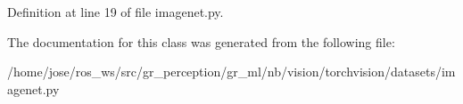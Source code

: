 Definition at line 19 of file imagenet.\+py.



The documentation for this class was generated from the following file\+:\begin{DoxyCompactItemize}
\item 
/home/jose/ros\+\_\+ws/src/gr\+\_\+perception/gr\+\_\+ml/nb/vision/torchvision/datasets/imagenet.\+py\end{DoxyCompactItemize}
